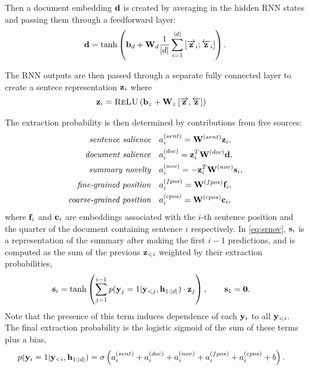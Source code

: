 Then a document embedding $\mathbf{d}$ is created by averaging in the hidden
RNN states and passing them through a feedforward layer: 
\begin{align}
    \mathbf{d} = \tanh\left(\mathbf{b}_d + \mathbf{W}_d\frac{1}{| d |}
    \sum_{i=1}^{| d |} \left[\overrightarrow{\mathbf{z}}_i; \overleftarrow{\mathbf{z}}_i\right] \right).
\end{align}

The RNN outputs are then passed through a separate fully connected layer to 
create a sentece representation $\mathbf{z}_i$ where 
\begin{align}
    \mathbf{z}_i &= \textsc{ReLU}\left(\mathbf{b}_z + \mathbf{W}_z \left[ \overrightarrow{\mathbf{z}},\overleftarrow{\mathbf{z}}\right]\right)
\end{align}

The extraction probability is then determined by contributions from five 
sources:
\begin{align}
    \textit{sentence salience} &\quad a^{(sent)}_i=\mathbf{W}^{(sent)} \mathbf{z}_i, \\
    \textit{document salience}&\quad a^{(doc)}_i = \mathbf{z}_i^T\mathbf{W}^{(doc)} \mathbf{d}, \\
    \textit{summary novelty}&\quad a^{(nov)}_i = -\mathbf{z}_i^T\mathbf{W}^{(nov)} \mathbf{s}_i, \label{eq:srnov} \\
    \textit{fine-grained position}&\quad a^{(fpos)}_i = \mathbf{W}^{(fpos)} 
    \mathbf{f}_i, \\
    \textit{coarse-grained position}&\quad a^{(cpos)}_i = \mathbf{W}^{(cpos)} 
    \mathbf{c}_i,
\end{align}
where $\mathbf{f}_i$ and $\mathbf{c}_i$ are embeddings associated with the $i$-th sentence
position and the quarter of the document containing sentence $i$ respectively.
In \autoref{eq:srnov}, $\mathbf{s}_i$ is a representation of the summary after
making the first $i-1$ predictions, and is 
computed as the
sum of the previous $\mathbf{z}_{<i}$ weighted by their extraction probabilities,
\begin{align}
    \mathbf{s}_i & = \tanh\left(\sum_{j=1}^{i-1} p(\mathbf{y}_j=1|\mathbf{y}_{<j},\mathbf{h}_{1:| d |}) \cdot \mathbf{z}_j\right), \quad\quad \mathbf{s}_1 = \mathbf{0}.
\end{align}
Note that the presence of this term induces dependence of each 
$\mathbf{y}_i$ to 
all $\mathbf{y}_{<i}$. %
The final extraction probability is the logistic sigmoid of the
sum of these terms plus a bias,
\begin{align}
    p(\mathbf{y}_i=1|\mathbf{y}_{<i}, \mathbf{h}_{1:| d |}) &= \sigma\left(
      a_i^{(sent)} + a_i^{(doc)} + a_i^{(nov)} 
  + a_i^{(fpos)}  + a_i^{(cpos)} + b \right).
\end{align}
